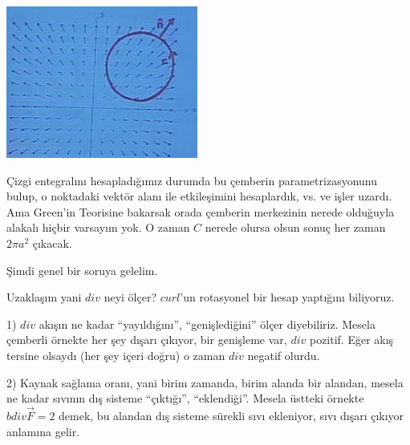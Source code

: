 \documentclass[12pt,fleqn]{article}\usepackage{../../common}
\begin{document}
\begin{center}

\includegraphics[height=5cm]{23_9.png}

\end{center}
Çizgi entegralını hesapladığımız durumda bu çemberin parametrizasyonunu
bulup, o noktadaki vektör alanı ile etkileşimini hesaplardık, vs. ve işler
uzardı. Ama Green'in Teorisine bakarsak orada çemberin merkezinin nerede
olduğuyla alakalı hiçbir varsayım yok. O zaman $C$ nerede olursa olsun
sonuç her zaman $2\pi a^2$ çıkacak. 

Şimdi genel bir soruya gelelim. 

Uzaklaşım yani $div$ neyi ölçer? $curl$'un rotasyonel bir hesap yaptığını
biliyoruz. 

1) $div$ akışın ne kadar ``yayıldığını'', ``genişlediğini'' ölçer
diyebiliriz. Mesela çemberli örnekte her şey dışarı çıkıyor, bir genişleme
var, $div$ pozitif. Eğer akış tersine olsaydı (her şey içeri doğru) o zaman
$div$ negatif olurdu. 

2) Kaynak sağlama oranı, yani birim zamanda, birim alanda bir alandan,
mesela ne kadar sıvının dış sisteme ``çıktığı'', ``eklendiği''. Mesela
üstteki örnekte $bdiv \vec{F} = 2$ demek, bu alandan dış sisteme sürekli
sıvı ekleniyor, sıvı dışarı çıkıyor anlamına gelir.
\end{document}
